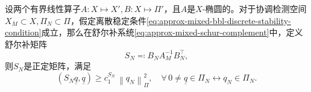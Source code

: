 \begin{lemma}[舒尔补系统的唯一可解性]
  \label{lemma:approx-mixed-schur-system-uniq}
  设两个有界线性算子$A:X \mapsto X', B: X \mapsto \Pi'$，且$A$是$X$-椭圆的。对于协调检测空间$X_{M} \subset X, \Pi_{N} \subset \Pi$，假定离散稳定条件\eqref{eq:approx-mixed-bbl-discrete-stability-condition}成立，那么在舒尔补系统\eqref{eq:approx-mixed-schur-complement}中，定义舒尔补矩阵
  \begin{equation*}
    S_{N} \eqqcolon B_{N} A_{M}^{-1} B_{N}^{\top},
  \end{equation*}
  则$S_{N}$是正定矩阵，满足
  \begin{equation}
    \label{eq:approx-mixed-schur-matrix-posdef}
    \left( S_{N} \underline{q}, \underline{q} \right) \ge
    c_{1}^{S_{N}} \, \left\| q_{N} \right\|_{\Pi}^{2}, \quad \forall \, 0 \neq \underline{q} \in \Pi_{N} \leftrightarrow q_{N} \in \Pi_{N}.
  \end{equation}
\end{lemma}
